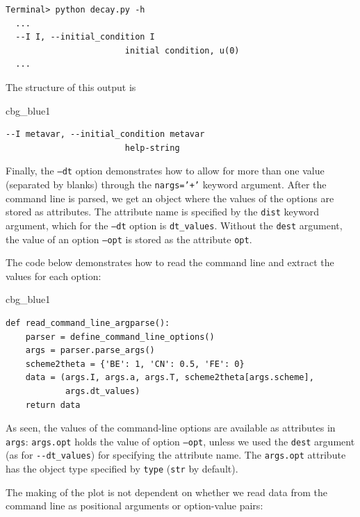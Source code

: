 \documentclass[%
oneside,                 %
final,                   %
10pt]{article}
\newenvironment{_cod_tight}[1]{
   \def\FrameCommand{\colorbox{#1}}
   \FrameRule0.6pt\MakeFramed {\FrameRestore}\vskip3mm}
   {\vskip0mm\endMakeFramed}
\newenvironment{cod}[1]{
\bgroup\rmfamily
\fboxsep=0mm\relax
\begin{_cod_tight}{#1}
\list{}{\parsep=-2mm\parskip=0mm\topsep=0pt\leftmargin=2mm
\rightmargin=2\leftmargin\leftmargin=4pt\relax}
\item\relax}
{\endlist\end{_cod_tight}\egroup}
\begin{document}
\begin{Verbatim}[frame=lines,label=\fbox{{\tiny Terminal}},framesep=2.5mm,framerule=0.7pt,fontsize=\fontsize{9pt}{9pt}]
Terminal> python decay.py -h
  ...
  --I I, --initial_condition I
                        initial condition, u(0)
  ...
\end{Verbatim}
The structure of this output is

\begin{cod}{cbg_blue1}\begin{Verbatim}[numbers=none,fontsize=\fontsize{9pt}{9pt},baselinestretch=0.95,xleftmargin=2mm]
  --I metavar, --initial_condition metavar
                        help-string
\end{Verbatim}
\end{cod}
\noindent



Finally, the \texttt{--dt} option demonstrates how to allow for more than one
value (separated by blanks) through the \texttt{nargs='+'} keyword argument.
After the command line is parsed, we get an object where the values of
the options are stored as attributes. The attribute name is specified
by the \texttt{dist} keyword argument, which for the \texttt{--dt} option is
\Verb!dt_values!. Without the \texttt{dest} argument, the value of an option \texttt{--opt}
is stored as the attribute \texttt{opt}.

The code below demonstrates how to read the command line and extract
the values for each option:

\begin{cod}{cbg_blue1}\begin{Verbatim}[numbers=none,fontsize=\fontsize{9pt}{9pt},baselinestretch=0.95,xleftmargin=2mm]
def read_command_line_argparse():
    parser = define_command_line_options()
    args = parser.parse_args()
    scheme2theta = {'BE': 1, 'CN': 0.5, 'FE': 0}
    data = (args.I, args.a, args.T, scheme2theta[args.scheme],
            args.dt_values)
    return data
\end{Verbatim}
\end{cod}
\noindent
As seen, the values of the command-line options are available as
attributes in \texttt{args}: \texttt{args.opt} holds the value of option \texttt{--opt}, unless
we used the \texttt{dest} argument (as for \Verb!--dt_values!) for specifying the
attribute name. The \texttt{args.opt} attribute has the object type specified
by \texttt{type} (\texttt{str} by default).

The making of the plot is not dependent on whether we read data from
the command line as positional arguments or option-value pairs:
\end{document}
